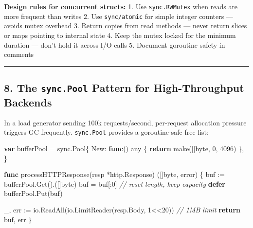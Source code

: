 \documentclass[
]{article}
\newenvironment{Shaded}{}{}
\newcommand{\BuiltInTok}[1]{\textcolor[rgb]{0.00,0.50,0.00}{#1}}
\newcommand{\CommentTok}[1]{\textcolor[rgb]{0.38,0.63,0.69}{\textit{#1}}}
\newcommand{\ControlFlowTok}[1]{\textcolor[rgb]{0.00,0.44,0.13}{\textbf{#1}}}
\newcommand{\DataTypeTok}[1]{\textcolor[rgb]{0.56,0.13,0.00}{#1}}
\newcommand{\DecValTok}[1]{\textcolor[rgb]{0.25,0.63,0.44}{#1}}
\newcommand{\KeywordTok}[1]{\textcolor[rgb]{0.00,0.44,0.13}{\textbf{#1}}}
\newcommand{\NormalTok}[1]{#1}
\newcommand{\OperatorTok}[1]{\textcolor[rgb]{0.40,0.40,0.40}{#1}}
\begin{document}
\textbf{Design rules for concurrent structs:} 1. Use
\texttt{sync.RWMutex} when reads are more frequent than writes 2. Use
\texttt{sync/atomic} for simple integer counters --- avoids mutex
overhead 3. Return copies from read methods --- never return slices or
maps pointing to internal state 4. Keep the mutex locked for the minimum
duration --- don't hold it across I/O calls 5. Document goroutine safety
in comments

\begin{center}\rule{0.5\linewidth}{0.5pt}\end{center}

\hypertarget{the-sync.pool-pattern-for-high-throughput-backends}{%
\subsection{\texorpdfstring{8. The \texttt{sync.Pool} Pattern for
High-Throughput
Backends}{8. The sync.Pool Pattern for High-Throughput Backends}}\label{the-sync.pool-pattern-for-high-throughput-backends}}

In a load generator sending 100k requests/second, per-request allocation
pressure triggers GC frequently. \texttt{sync.Pool} provides a
goroutine-safe free list:

\begin{Shaded}
\begin{Highlighting}[]
\KeywordTok{var}\NormalTok{ bufferPool }\OperatorTok{=}\NormalTok{ sync}\OperatorTok{.}\NormalTok{Pool}\OperatorTok{\{}
\NormalTok{    New}\OperatorTok{:} \KeywordTok{func}\OperatorTok{()}\NormalTok{ any }\OperatorTok{\{}
        \ControlFlowTok{return} \BuiltInTok{make}\OperatorTok{([]}\DataTypeTok{byte}\OperatorTok{,} \DecValTok{0}\OperatorTok{,} \DecValTok{4096}\OperatorTok{)}
    \OperatorTok{\},}
\OperatorTok{\}}

\KeywordTok{func}\NormalTok{ processHTTPResponse}\OperatorTok{(}\NormalTok{resp }\OperatorTok{*}\NormalTok{http}\OperatorTok{.}\NormalTok{Response}\OperatorTok{)} \OperatorTok{([]}\DataTypeTok{byte}\OperatorTok{,} \DataTypeTok{error}\OperatorTok{)} \OperatorTok{\{}
\NormalTok{    buf }\OperatorTok{:=}\NormalTok{ bufferPool}\OperatorTok{.}\NormalTok{Get}\OperatorTok{().([]}\DataTypeTok{byte}\OperatorTok{)}
\NormalTok{    buf }\OperatorTok{=}\NormalTok{ buf}\OperatorTok{[:}\DecValTok{0}\OperatorTok{]} \CommentTok{// reset length, keep capacity}
    \ControlFlowTok{defer}\NormalTok{ bufferPool}\OperatorTok{.}\NormalTok{Put}\OperatorTok{(}\NormalTok{buf}\OperatorTok{)}

\NormalTok{    \_}\OperatorTok{,}\NormalTok{ err }\OperatorTok{:=}\NormalTok{ io}\OperatorTok{.}\NormalTok{ReadAll}\OperatorTok{(}\NormalTok{io}\OperatorTok{.}\NormalTok{LimitReader}\OperatorTok{(}\NormalTok{resp}\OperatorTok{.}\NormalTok{Body}\OperatorTok{,} \DecValTok{1}\OperatorTok{\textless{}\textless{}}\DecValTok{20}\OperatorTok{))} \CommentTok{// 1MB limit}
    \ControlFlowTok{return}\NormalTok{ buf}\OperatorTok{,}\NormalTok{ err}
\OperatorTok{\}}
\end{Highlighting}
\end{Shaded}
\end{document}
